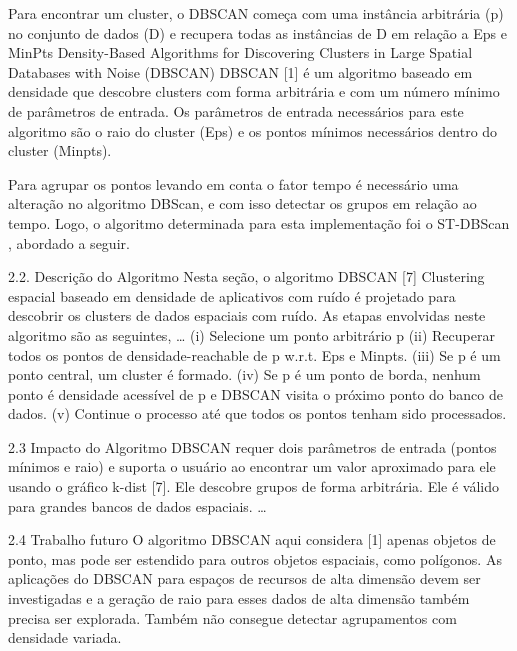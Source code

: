Para encontrar um cluster, o DBSCAN começa com uma instância arbitrária (p) no conjunto de dados (D) e recupera todas as instâncias de D em relação a Eps e MinPts
Density-Based Algorithms for Discovering Clusters in Large Spatial Databases with Noise (DBSCAN)
DBSCAN [1] é um algoritmo baseado em densidade que descobre clusters com forma arbitrária e com um número mínimo de parâmetros de entrada. Os parâmetros de entrada necessários para este algoritmo são o raio do cluster (Eps) e os pontos mínimos necessários dentro do cluster (Minpts).

Para agrupar os pontos levando em conta o fator tempo é necessário uma alteração no algoritmo DBScan, e com isso detectar os grupos em relação ao tempo. Logo, o algoritmo determinada para esta implementação foi o ST-DBScan \cite{Birant2007STDBSCANAA}, abordado a seguir.

2.2. Descrição do Algoritmo
Nesta seção, o algoritmo DBSCAN [7] Clustering espacial baseado em densidade de aplicativos com ruído é projetado para descobrir os clusters de dados espaciais com ruído. As etapas envolvidas neste algoritmo são as seguintes,
…
(i) Selecione um ponto arbitrário p
(ii) Recuperar todos os pontos de densidade-reachable de p w.r.t. Eps e Minpts.
(iii) Se p é um ponto central, um cluster é formado.
(iv) Se p é um ponto de borda, nenhum ponto é densidade acessível de p e DBSCAN visita o próximo ponto do banco de dados.
(v) Continue o processo até que todos os pontos tenham sido processados.

2.3 Impacto do Algoritmo
DBSCAN requer dois parâmetros de entrada (pontos mínimos e raio) e suporta o usuário ao encontrar um valor aproximado para ele usando o gráfico k-dist [7]. Ele descobre grupos de forma arbitrária. Ele é válido para grandes bancos de dados espaciais.
…

2.4 Trabalho futuro
O algoritmo DBSCAN aqui considera [1] apenas objetos de ponto, mas pode ser estendido para outros objetos espaciais, como polígonos. As aplicações do DBSCAN para espaços de recursos de alta dimensão devem ser investigadas e a geração de raio para esses dados de alta dimensão também precisa ser explorada. Também não consegue detectar agrupamentos com densidade variada.

